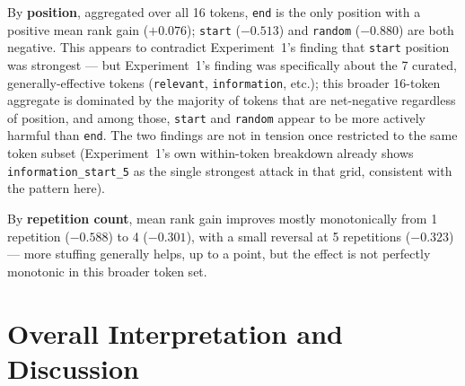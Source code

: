 \documentclass[11pt]{article}
\begin{document}
By \textbf{position}, aggregated over all 16 tokens, \texttt{end} is the
only position with a positive mean rank gain ($+0.076$); \texttt{start}
($-0.513$) and \texttt{random} ($-0.880$) are both negative. This appears
to contradict Experiment~1's finding that \texttt{start} position was
strongest — but Experiment~1's finding was specifically about the 7
curated, generally-effective tokens (\texttt{relevant}, \texttt{information},
etc.); this broader 16-token aggregate is dominated by the majority of
tokens that are net-negative regardless of position, and among those,
\texttt{start} and \texttt{random} appear to be more actively harmful than
\texttt{end}. The two findings are not in tension once restricted to the
same token subset (Experiment~1's own within-token breakdown already shows
\texttt{information\_start\_5} as the single strongest attack in that
grid, consistent with the pattern here).

By \textbf{repetition count}, mean rank gain improves mostly monotonically
from 1 repetition ($-0.588$) to 4 ($-0.301$), with a small reversal at 5
repetitions ($-0.323$) — more stuffing generally helps, up to a point, but
the effect is not perfectly monotonic in this broader token set.

\section{Overall Interpretation and Discussion}
\end{document}
